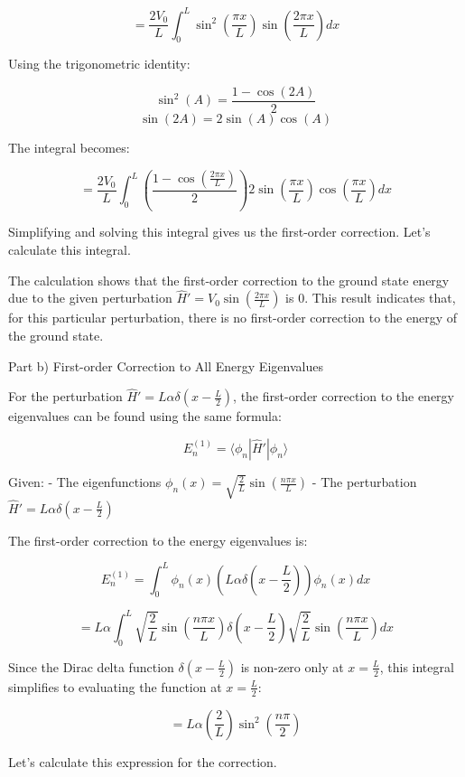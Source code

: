 \[ = \frac{2V_0}{L} \int_0^L \sin^2\left(\frac{\pi x}{L} \right) \sin\left(\frac{2 \pi x}{L} \right) dx \]

Using the trigonometric identity:

\[ \sin^2(A) = \frac{1 - \cos(2A)}{2} \]
\[ \sin(2A) = 2\sin(A)\cos(A) \]

The integral becomes:

\[ = \frac{2V_0}{L} \int_0^L \left(\frac{1 - \cos\left(\frac{2\pi x}{L}\right)}{2}\right) 2\sin\left(\frac{\pi x}{L}\right)\cos\left(\frac{\pi x}{L}\right) dx \]

Simplifying and solving this integral gives us the first-order correction. Let's calculate this integral.

The calculation shows that the first-order correction to the ground state energy due to the given perturbation \( \hat{H}' = V_0 \sin\left(\frac{2 \pi x}{L} \right) \) is \( 0 \). This result indicates that, for this particular perturbation, there is no first-order correction to the energy of the ground state.

Part b) First-order Correction to All Energy Eigenvalues

For the perturbation \( \hat{H}' = L\alpha \delta\left(x - \frac{L}{2} \right) \), the first-order correction to the energy eigenvalues can be found using the same formula:

\[ E_n^{(1)} = \langle \phi_n | \hat{H}' | \phi_n \rangle \]

Given:
- The eigenfunctions \( \phi_{n}(x) = \sqrt{\frac{2}{L}} \sin\left(\frac{n \pi x}{L} \right) \)
- The perturbation \( \hat{H}' = L\alpha \delta\left(x - \frac{L}{2} \right) \)

The first-order correction to the energy eigenvalues is:

\[ E_n^{(1)} = \int_0^L \phi_n(x) \left(L\alpha \delta\left(x - \frac{L}{2} \right)\right) \phi_n(x) dx \]

\[ = L\alpha \int_0^L \sqrt{\frac{2}{L}} \sin\left(\frac{n \pi x}{L} \right) \delta\left(x - \frac{L}{2} \right) \sqrt{\frac{2}{L}} \sin\left(\frac{n \pi x}{L} \right) dx \]

Since the Dirac delta function \( \delta\left(x - \frac{L}{2} \right) \) is non-zero only at \( x = \frac{L}{2} \), this integral simplifies to evaluating the function at \( x = \frac{L}{2} \):

\[ = L\alpha \left(\frac{2}{L}\right) \sin^2\left(\frac{n \pi}{2}\right) \]

Let's calculate this expression for the correction.

